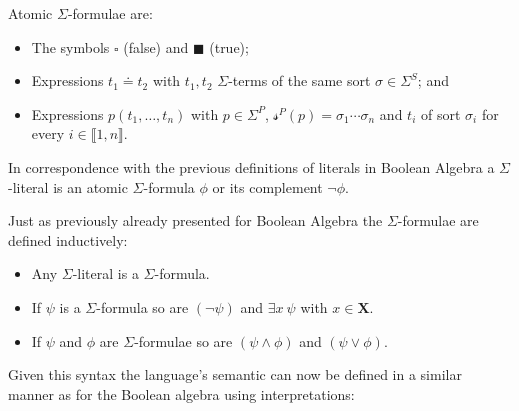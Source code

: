 \begin{definition}
Atomic $\Sigma$-formulae are:
\begin{itemize}
    \item The symbols $\square$ (false) and $\blacksquare$ (true);
    \item Expressions $t_1 \doteq t_2$ with $t_1, t_2$ $\Sigma$-terms of the same sort $\sigma\in\Sigma^S$; and
    \item Expressions $p\left(t_1,\dots,t_n\right)$ with $p\in\Sigma^P$, $\mathcal{s}^P(p)=\sigma_1\dotsi\sigma_n$ and $t_i$ of sort $\sigma_i$ for every $i\in\llbracket1,n\rrbracket$.
\end{itemize}
In correspondence with the previous definitions of literals in Boolean Algebra a $\Sigma$-literal is an atomic $\Sigma$-formula $\phi$ or its complement $\neg\phi$.
\end{definition}

\begin{definition}
Just as previously already presented for Boolean Algebra the $\Sigma$-formulae are defined inductively:
\begin{itemize}
    \item Any $\Sigma$-literal is a $\Sigma$-formula.
    \item If $\psi$ is a $\Sigma$-formula so are $\left(\neg\psi\right)$ and $\exists x\ \psi$ with $x\in\mathbf{X}$.
    \item If $\psi$ and $\phi$ are $\Sigma$-formulae so are $\left(\psi\land\phi\right)$ and $\left(\psi\lor\phi\right)$.
\end{itemize}
\end{definition}

Given this syntax the language's semantic can now be defined in a similar manner as for the Boolean algebra using interpretations:

